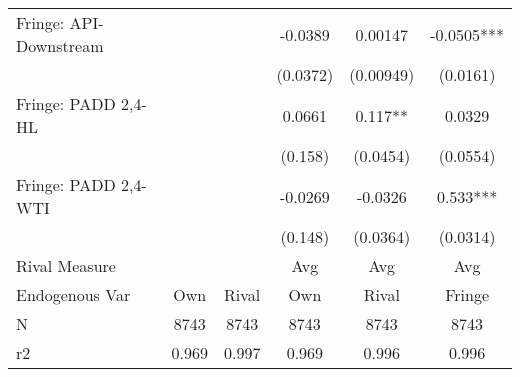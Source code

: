 {\begin{tabular}{l*{5}{c}}
\addlinespace
Fringe: API-Downstream&            &            &  -0.0389   &  0.00147   &  -0.0505***\\
                &            &            & (0.0372)   &(0.00949)   & (0.0161)   \\
\addlinespace
Fringe: PADD 2,4-HL&            &            &   0.0661   &    0.117** &   0.0329   \\
                &            &            &  (0.158)   & (0.0454)   & (0.0554)   \\
\addlinespace
Fringe: PADD 2,4-WTI&            &            &  -0.0269   &  -0.0326   &    0.533***\\
                &            &            &  (0.148)   & (0.0364)   & (0.0314)   \\
\midrule
Rival Measure   &            &            &      Avg   &      Avg   &      Avg   \\
Endogenous Var  &      Own   &    Rival   &      Own   &    Rival   &   Fringe   \\
N               &     8743   &     8743   &     8743   &     8743   &     8743   \\
r2              &    0.969   &    0.997   &    0.969   &    0.996   &    0.996   \\
\bottomrule
\end{tabular}
}
